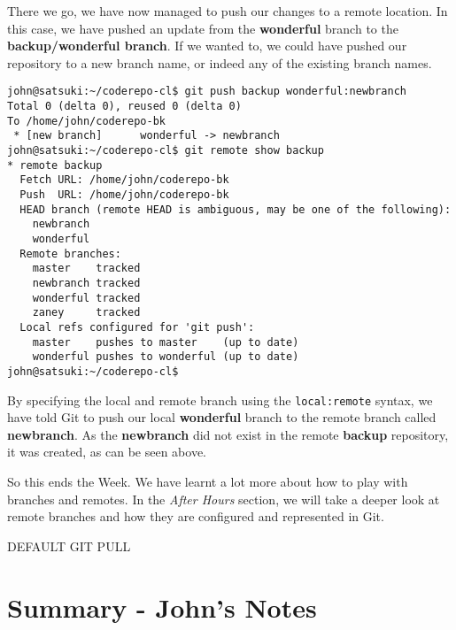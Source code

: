 There we go, we have now managed to push our changes to a remote location.  In this case, we have pushed an update from the \textbf{wonderful} branch to the \textbf{backup/wonderful branch}.  If we wanted to, we could have pushed our repository to a new branch name, or indeed any of the existing branch names.

\begin{Verbatim}[frame=leftline,framerule=1mm,fontsize=\relsize{-3}] 
john@satsuki:~/coderepo-cl$ git push backup wonderful:newbranch
Total 0 (delta 0), reused 0 (delta 0)
To /home/john/coderepo-bk
 * [new branch]      wonderful -> newbranch
john@satsuki:~/coderepo-cl$ git remote show backup
* remote backup
  Fetch URL: /home/john/coderepo-bk
  Push  URL: /home/john/coderepo-bk
  HEAD branch (remote HEAD is ambiguous, may be one of the following):
    newbranch
    wonderful
  Remote branches:
    master    tracked
    newbranch tracked
    wonderful tracked
    zaney     tracked
  Local refs configured for 'git push':
    master    pushes to master    (up to date)
    wonderful pushes to wonderful (up to date)
john@satsuki:~/coderepo-cl$ 
\end{Verbatim}

By specifying the local and remote branch using the \texttt{local:remote} syntax, we have told Git to push our local \textbf{wonderful} branch to the remote branch called \textbf{newbranch}.  As the \textbf{newbranch} did not exist in the remote \textbf{backup} repository, it was created, as can be seen above.

So this ends the Week.  We have learnt a lot more about how to play with branches and remotes.  In the \emph{After Hours} section, we will take a deeper look at remote branches and how they are configured and represented in Git.

DEFAULT GIT PULL


\clearpage

\section{Summary - John's Notes}
